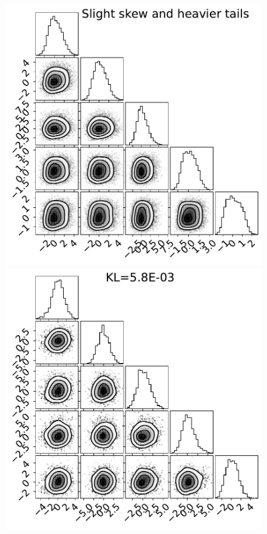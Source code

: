 \begin{figure}[t]
    \includegraphics[scale=0.28]{figs/expts-2d/sinh_5D_target3v2.pdf}
    \includegraphics[scale=0.28]{figs/expts-2d/sinh_5D_target1-fit.pdf}

\end{figure}
